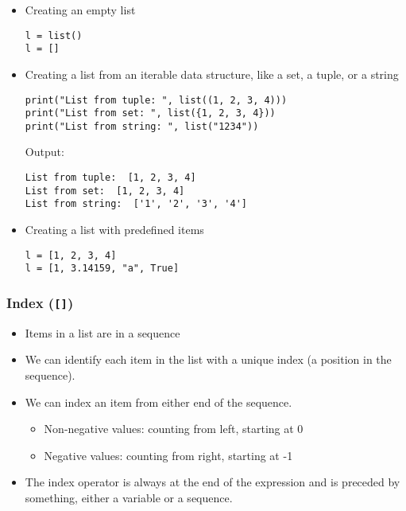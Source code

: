 \documentclass[11pt]{article}
\begin{document}
\begin{itemize}
\item Creating an empty list
\begin{verbatim}
l = list()
l = []
\end{verbatim}

\item Creating a list from an iterable data structure, like a set, a tuple, or a string

\begin{verbatim}
print("List from tuple: ", list((1, 2, 3, 4)))
print("List from set: ", list({1, 2, 3, 4}))
print("List from string: ", list("1234"))
\end{verbatim}

 \noindent Output:

\begin{verbatim}
List from tuple:  [1, 2, 3, 4]
List from set:  [1, 2, 3, 4]
List from string:  ['1', '2', '3', '4']
\end{verbatim}

\item Creating a list with predefined items
\begin{verbatim}
l = [1, 2, 3, 4]
l = [1, 3.14159, "a", True]
\end{verbatim}
\end{itemize}

 \newpage

\subsubsection{Index (\texttt{[]})}
\label{sec:org3998ac4}
\begin{itemize}
\item Items in a list are in a sequence
\item We can identify each item in the list with a unique index (a position in the sequence).
\item We can index an item from either end of the sequence.
\begin{itemize}
\item Non-negative values: counting from left, starting at 0
\item Negative values: counting from right, starting at -1
\end{itemize}
\item The index operator is always at the end of the expression and is preceded by something, either a variable or a sequence.
\end{itemize}
\end{document}
